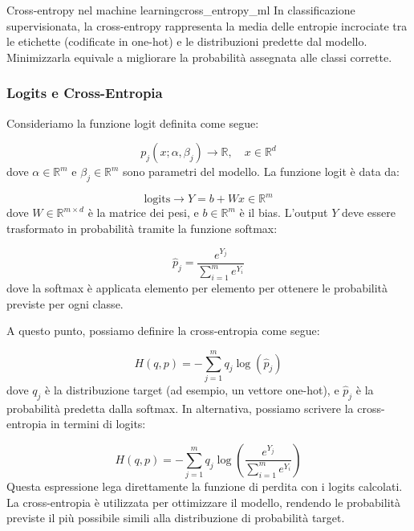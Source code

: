 \begin{nota}{Cross-entropy nel machine learning}{cross_entropy_ml}
    In classificazione supervisionata, la cross-entropy rappresenta la media delle entropie incrociate tra le etichette (codificate in one-hot) e le distribuzioni predette dal modello. Minimizzarla equivale a migliorare la probabilità assegnata alle classi corrette.
\end{nota}

\subsubsection{Logits e Cross-Entropia}

Consideriamo la funzione logit definita come segue:

\[
p_j(x; \alpha, \beta_j) \rightarrow \mathbb{R}, \quad x \in \mathbb{R}^d
\]
dove \( \alpha \in \mathbb{R}^m \) e \( \beta_j \in \mathbb{R}^m \) sono parametri del modello. La funzione logit è data da:

\[
\text{logits} \rightarrow Y = b + W x \in \mathbb{R}^m
\]
dove \( W \in \mathbb{R}^{m \times d} \) è la matrice dei pesi, e \( b \in \mathbb{R}^m \) è il bias. L'output \( Y \) deve essere trasformato in probabilità tramite la funzione softmax:

\[
\hat{p}_j = \frac{e^{Y_j}}{\sum_{i=1}^m e^{Y_i}}
\]
dove la softmax è applicata elemento per elemento per ottenere le probabilità previste per ogni classe.

A questo punto, possiamo definire la cross-entropia come segue:

\[
H(q, p) = - \sum_{j=1}^m q_j \log \left( \hat{p}_j \right)
\]
dove \( q_j \) è la distribuzione target (ad esempio, un vettore one-hot), e \( \hat{p}_j \) è la probabilità predetta dalla softmax. In alternativa, possiamo scrivere la cross-entropia in termini di logits:

\[
H(q, p) = - \sum_{j=1}^m q_j \log \left( \frac{e^{Y_j}}{\sum_{i=1}^m e^{Y_i}} \right)
\]
Questa espressione lega direttamente la funzione di perdita con i logits calcolati. La cross-entropia è utilizzata per ottimizzare il modello, rendendo le probabilità previste il più possibile simili alla distribuzione di probabilità target.
